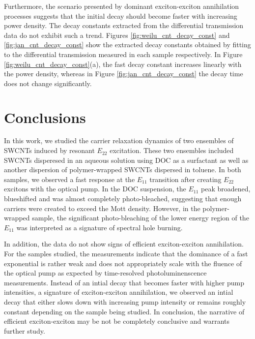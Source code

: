 Furthermore, the scenario presented by dominant exciton-exciton annihilation processes suggests that the initial decay should become faster with increasing power density. The decay constants extracted from the differential transmission data do not exhibit such a trend. Figures \ref{fig:weilu_cnt_decay_const} and \ref{fig:jan_cnt_decay_const} show the extracted decay constants obtained by fitting to the differential transmission measured in each sample respectively. In Figure \ref{fig:weilu_cnt_decay_const}(a), the fast decay constant increases linearly with the power density, whereas in Figure \ref{fig:jan_cnt_decay_const} the decay time does not change significantly.


\section{Conclusions}

In this work, we studied the carrier relaxation dynamics of two ensembles of SWCNTs induced by resonant $E_{22}$ excitation. These two ensembles included SWCNTs disperesed in an aqueous solution using DOC as a surfactant as well as another dispersion of polymer-wrapped SWCNTs dispersed in toluene. In both samples, we observed a fast response at the $E_{11}$ transition after creating $E_{22}$ excitons with the optical pump. In the DOC suspension, the $E_{11}$ peak broadened, blueshifted and was almost completely photo-bleached, suggesting that enough carriers were created to exceed the Mott density. However, in the polymer-wrapped sample, the significant photo-bleaching of the lower energy region of the $E_{11}$ was interpreted as a signature of spectral hole burning.

In addition, the data do not show signs of efficient exciton-exciton annihilation. For the samples studied, the measurements indicate that the dominance of a fast exponential is rather weak and does not appropriately scale with the fluence of the optical pump as expected by time-resolved photoluminenscence measurements. Instead of an intial decay that becomes faster with higher pump intensities, a signature of exciton-exciton annihilation, we observed an intial decay that either slows down with increasing pump intensity or remains roughly constant depending on the sample being studied. In conclusion, the narrative of efficient exciton-exciton may be not be completely conclusive and warrants further study.
